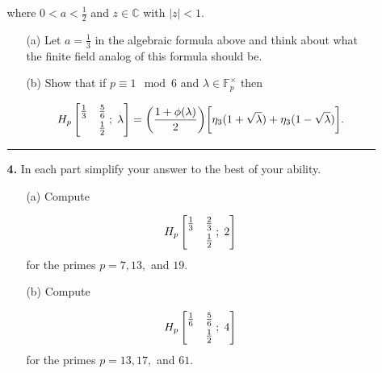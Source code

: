 \documentclass[12pt]{amsart}
\theoremstyle{definition}
\theoremstyle{remark}
\numberwithin{equation}{section}
\def \l {\lambda}
\def\C{\mathbb C}
\def \l {\lambda}
\def\C{\mathbb{C}}
\newcommand{\fp}
{\mathbb{F}_p}
\begin{document}
\begin{itemize}
\begin{itemize}
\vspace{4mm}

where $0 < a < \frac{1}{2}$ and $z \in \C$ with $|z| < 1$.

\vspace{4mm}

\begin{itemize}
\item[(a)] Let $a = \frac{1}{3}$ in the algebraic formula above and think about what the finite field analog of this formula should be.

\vspace{4mm}

\item[(b)] Show that if $p \equiv 1 \mod 6$ and $\l \in \fp^{\times}$ then

$$H_{p}\left[\begin{matrix} \frac{1}{3} & \frac{5}{6} \smallskip \\   & \frac{1}{2} \end{matrix} \; ; \; \l \right] = \bigg(\frac{1 + \phi(\l)}{2} \bigg) \bigg[\eta_{3}(1 + \sqrt{\l}) + \eta_{3}(1 - \sqrt{\l}) \bigg].$$
\end{itemize}

\vspace{8mm}

\hrule{}

\vspace{4mm}

\item[\textbf{4.}] In each part simplify your answer to the best of your ability.

\vspace{4mm}

\begin{itemize}
\item[(a)] Compute 

$$H_{p}\left[\begin{matrix} \frac{1}{3} & \frac{2}{3} \smallskip \\   & \frac{1}{2} \end{matrix} \; ; \; 2 \right]$$ for the primes $p = 7, 13,$ and $19$.

\vspace{4mm}

\item[(b)] Compute 

$$H_{p}\left[\begin{matrix} \frac{1}{6} & \frac{5}{6} \smallskip \\   & \frac{1}{2} \end{matrix} \; ; \; 4 \right]$$ for the primes $p = 13, 17,$ and $61$.


\end{itemize}
\end{itemize}
\end{itemize}
\end{document}
